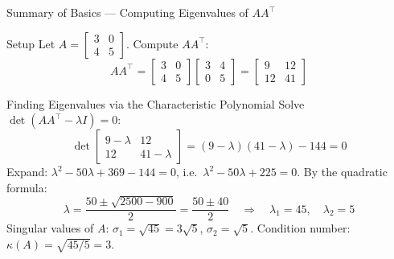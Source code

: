 \documentclass{beamer}
\begin{document}
\begin{frame}[shrink=10]{Summary of Basics --- Computing Eigenvalues of $AA^\top$}
  \begin{block}{Setup}
    Let $A = \begin{bmatrix}3 & 0\\4 & 5\end{bmatrix}$.
    Compute $AA^\top$:
    \[
      AA^\top
        = \begin{bmatrix}3&0\\4&5\end{bmatrix}
          \begin{bmatrix}3&4\\0&5\end{bmatrix}
        = \begin{bmatrix}9&12\\12&41\end{bmatrix}
    \]
  \end{block}

  \begin{block}{Finding Eigenvalues via the Characteristic Polynomial}
    Solve $\det(AA^\top - \lambda I) = 0$:
    \[
      \det\begin{bmatrix}9-\lambda & 12\\12 & 41-\lambda\end{bmatrix}
        = (9-\lambda)(41-\lambda) - 144 = 0
    \]
    Expand: $\lambda^2 - 50\lambda + 369 - 144 = 0$,\;
    i.e.\ $\lambda^2 - 50\lambda + 225 = 0$.
    By the quadratic formula:
    \[
      \lambda = \frac{50 \pm \sqrt{2500 - 900}}{2}
              = \frac{50 \pm 40}{2}
      \quad\Rightarrow\quad
      \lambda_1 = 45,\quad \lambda_2 = 5
    \]
    Singular values of $A$: $\sigma_1 = \sqrt{45} = 3\sqrt{5}$,\;
    $\sigma_2 = \sqrt{5}$.
    Condition number: $\kappa(A) = \sqrt{45/5} = 3$.
  \end{block}
\end{frame}
\end{document}
